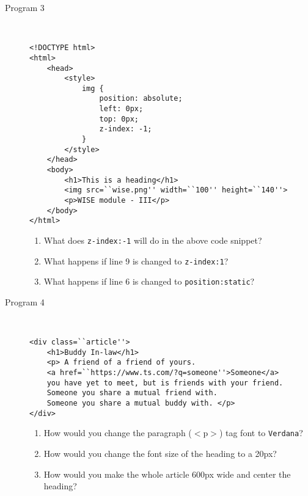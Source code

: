 \documentclass[11pt,a4paper]{article}
\def\AnswerBox{\fbox{\begin{minipage}{4in}\hfill\vspace{0.5in}\end{minipage}}}
\begin{document}
\begin{description}
\item [Program 3]\
\begin{lstlisting}
<!DOCTYPE html>
<html>
    <head>
        <style>
            img {
                position: absolute;
                left: 0px;
                top: 0px;
                z-index: -1;
            }
        </style>
    </head>
    <body>
        <h1>This is a heading</h1>
        <img src=``wise.png'' width=``100'' height=``140''>
        <p>WISE module - III</p>
    </body>
</html>
\end{lstlisting}
\AnswerBox

\begin{enumerate}[label=\bfseries Q\arabic*:]\itemsep10pt
\item What does \texttt{z-index:-1} will do in the above code snippet?
\item What happens if line 9 is changed to \texttt{z-index:1}?
\item What happens if line 6 is changed to \texttt{position:static}?
\end{enumerate}
\item [Program 4]\
\begin{lstlisting}
<div class=``article''>
    <h1>Buddy In-law</h1>
    <p> A friend of a friend of yours. 
    <a href=``https://www.ts.com/?q=someone''>Someone</a>
    you have yet to meet, but is friends with your friend. 
    Someone you share a mutual friend with. 
    Someone you share a mutual buddy with. </p>
</div>
\end{lstlisting}
\AnswerBox
\begin{enumerate}[label=\bfseries Q\arabic*:]\itemsep10pt
\item How would you change the paragraph ($<$p$>$) tag font to \texttt{Verdana}?
\item How would you change the font size of the heading to a 20px?
\item How would you make the whole article 600px wide and center the heading?
\end{enumerate}
\end{description}
\end{document}

